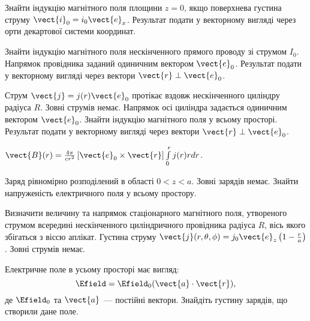 \begin{problem}
Знайти індукцію магнітного поля площини $z=0$, якщо поверхнева густина струму $\vect{i}_0 = i_0\vect{e}_x$. Результат подати у векторному вигляді через орти декартової системи координат.
\end{problem}

\begin{problem}
Знайти індукцію магнітного поля нескінченного прямого проводу зі струмом  $I_0$. Напрямок провідника заданий одиничним вектором $\vect{e}_0$. Результат подати у векторному вигляді через вектори $\vect{r} \perp \vect{e}_0$.
\end{problem}

\begin{problem}
Струм $\vect{j} = j(r)\vect{e}_0$ протікає вздовж нескінченного циліндру радіуса $R$. Зовні струмів немає. Напрямок осі циліндра задається одиничним вектором $\vect{e}_0$. Знайти індукцію магнітного поля у всьому просторі. Результат подати у векторному вигляді через вектори $\vect{r} \perp \vect{e}_0$.
\begin{solution}
	$\vect{B}(r) = \frac{4\pi}{cr^2}\left[ \vect{e}_0 \times \vect{r} \right]\int\limits_0^r j(r)r dr$.
\end{solution}
\end{problem}

\begin{problem}
Заряд рівномірно розподілений в області  $0 < z < a$. Зовні зарядів немає. Знайти напруженість електричного поля  у всьому простору.
\end{problem}

\begin{problem}
Визначити величину та напрямок стаціонарного магнітного поля, утвореного струмом всередині нескінченного циліндричного провідника радіуса $R$, вісь якого збігаться з віссю аплікат.  Густина струму   $\vect{j}(r, \theta,\phi) = j_0\vect{e}_z \left( 1- \frac{r}{a}\right) $. Зовні струмів немає.
\end{problem}

\begin{problem}
Електричне поле в усьому просторі має вигляд:
\[
	\Efield = \Efield_0 (\vect{a}\cdot \vect{r}),
\]
де $\Efield_0$ та $\vect{a}$~--- постійні вектори. Знайдіть густину зарядів, що створили дане поле.
\end{problem}

